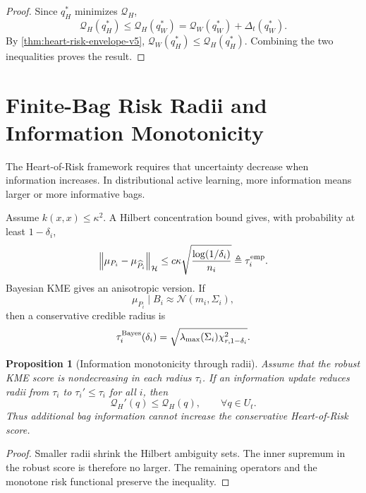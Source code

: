 \documentclass[10pt,journal]{IEEEtran}
\newtheorem{proposition}{Proposition}
\newcommand{\Hcal}{\mathcal{H}}
\newcommand{\norm}[1]{\left\lVert #1 \right\rVert}
\newcommand{\Qcal}{\mathcal{Q}}
\begin{document}
\begin{proof}
Since $q_H^*$ minimizes $\Qcal_H$,
\begin{equation}
    \Qcal_H(q_H^*)\le \Qcal_H(q_W^*)=\Qcal_W(q_W^*)+\Delta_t(q_W^*).
\end{equation}
By \cref{thm:heart-risk-envelope-v5}, $\Qcal_W(q_H^*)\le \Qcal_H(q_H^*)$. Combining the two inequalities proves the result.
\end{proof}

\section{Finite-Bag Risk Radii and Information Monotonicity}
\label{sec:radii-v5}

The Heart-of-Risk framework requires that uncertainty decrease when information increases. In distributional active learning, more information means larger or more informative bags.

Assume $k(x,x)\le \kappa^2$. A Hilbert concentration bound gives, with probability at least $1-\delta_i$,
\begin{equation}
\label{eq:kme-radius-v5}
    \norm{\mu_{P_i}-\mu_{\widehat P_i}}_{\Hcal}
    \le c\kappa\sqrt{\frac{\log(1/\delta_i)}{n_i}}
    \triangleq \tau_i^{\rm emp}.
\end{equation}
Bayesian KME gives an anisotropic version. If
\begin{equation}
    \mu_{P_i}\mid B_i\approx \mathcal N(m_i,\Sigma_i),
\end{equation}
then a conservative credible radius is
\begin{equation}
\label{eq:bayes-radius-v5}
    \tau_i^{\rm Bayes}(\delta_i)
    =\sqrt{\lambda_{\max}(\Sigma_i)\chi^2_{r,1-\delta_i}}.
\end{equation}

\begin{proposition}[Information monotonicity through radii]
\label{prop:radius-info-v5}
Assume that the robust KME score is nondecreasing in each radius $\tau_i$. If an information update reduces radii from $\tau_i$ to $\tau_i'\le \tau_i$ for all $i$, then
\begin{equation}
    \Qcal_H'(q)\le \Qcal_H(q),\qquad \forall q\in U_t.
\end{equation}
Thus additional bag information cannot increase the conservative Heart-of-Risk score.
\end{proposition}

\begin{proof}
Smaller radii shrink the Hilbert ambiguity sets. The inner supremum in the robust score is therefore no larger. The remaining operators and the monotone risk functional preserve the inequality.
\end{proof}
\end{document}
